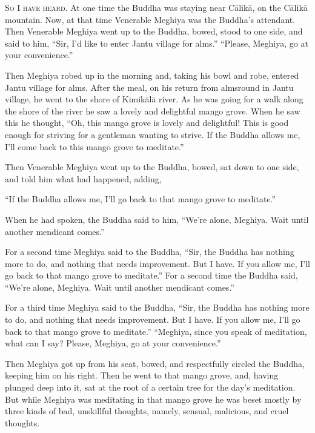 \documentclass[12pt,openany]{book}%
\newcommand*{\scevam}[1]{\textsc{#1}}
\begin{document}
\scevam{So I have heard. }At one time the Buddha was staying near \textsanskrit{Cālikā}, on the \textsanskrit{Cālikā} mountain. Now, at that time Venerable Meghiya was the Buddha’s attendant. Then Venerable Meghiya went up to the Buddha, bowed, stood to one side, and said to him, “Sir, I’d like to enter Jantu village for alms.” “Please, Meghiya, go at your convenience.” 

Then Meghiya robed up in the morning and, taking his bowl and robe, entered Jantu village for alms. After the meal, on his return from almsround in Jantu village, he went to the shore of \textsanskrit{Kimikālā} river. As he was going for a walk along the shore of the river he saw a lovely and delightful mango grove. When he saw this he thought, “Oh, this mango grove is lovely and delightful! This is good enough for striving for a gentleman wanting to strive. If the Buddha allows me, I’ll come back to this mango grove to meditate.” 

Then Venerable Meghiya went up to the Buddha, bowed, sat down to one side, and told him what had happened, adding, 

“If the Buddha allows me, I’ll go back to that mango grove to meditate.” 

When he had spoken, the Buddha said to him, “We’re alone, Meghiya. Wait until another mendicant comes.” 

For a second time Meghiya said to the Buddha, “Sir, the Buddha has nothing more to do, and nothing that needs improvement. But I have. If you allow me, I’ll go back to that mango grove to meditate.” For a second time the Buddha said, “We’re alone, Meghiya. Wait until another mendicant comes.” 

For a third time Meghiya said to the Buddha, “Sir, the Buddha has nothing more to do, and nothing that needs improvement. But I have. If you allow me, I’ll go back to that mango grove to meditate.” “Meghiya, since you speak of meditation, what can I say? Please, Meghiya, go at your convenience.” 

Then Meghiya got up from his seat, bowed, and respectfully circled the Buddha, keeping him on his right. Then he went to that mango grove, and, having plunged deep into it, sat at the root of a certain tree for the day’s meditation. But while Meghiya was meditating in that mango grove he was beset mostly by three kinds of bad, unskillful thoughts, namely, sensual, malicious, and cruel thoughts. 
\end{document}
